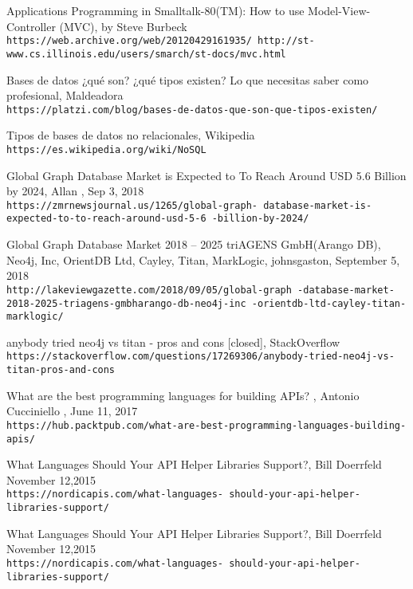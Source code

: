 \begin{thebibliography}{999}
Applications Programming in Smalltalk-80(TM):
How to use Model-View-Controller (MVC), by Steve Burbeck
\\\texttt{https://web.archive.org/web/20120429161935/
http://st-www.cs.illinois.edu/users/smarch/st-docs/mvc.html}


Bases de datos ¿qué son? ¿qué tipos existen? Lo que necesitas saber como profesional, Maldeadora
\\\texttt{https://platzi.com/blog/bases-de-datos-que-son-que-tipos-existen/}

Tipos de bases de datos no relacionales, Wikipedia
\\\texttt{https://es.wikipedia.org/wiki/NoSQL}

Global Graph Database Market is Expected to To Reach Around USD 5.6 Billion by 2024, Allan , Sep 3, 2018
\\\texttt{https://zmrnewsjournal.us/1265/global-graph-
database-market-is-expected-to-to-reach-around-usd-5-6
-billion-by-2024/}


Global Graph Database Market 2018 – 2025 triAGENS GmbH(Arango DB), Neo4j, Inc, OrientDB Ltd, Cayley, Titan, MarkLogic, johnsgaston, September 5, 2018 
\\\texttt{http://lakeviewgazette.com/2018/09/05/global-graph
-database-market-2018-2025-triagens-gmbharango-db-neo4j-inc
-orientdb-ltd-cayley-titan-marklogic/}

anybody tried neo4j vs titan - pros and cons [closed], StackOverflow
\\\texttt{https://stackoverflow.com/questions/17269306/anybody-tried-neo4j-vs-titan-pros-and-cons}

What are the best programming languages for building APIs? , Antonio Cucciniello , June 11, 2017
\\\texttt{https://hub.packtpub.com/what-are-best-programming-languages-building-apis/}

What Languages Should Your API Helper Libraries Support?,  Bill Doerrfeld November 12,2015
\\\texttt{https://nordicapis.com/what-languages-
should-your-api-helper-libraries-support/}

What Languages Should Your API Helper Libraries Support?,  Bill Doerrfeld November 12,2015
\\\texttt{https://nordicapis.com/what-languages-
should-your-api-helper-libraries-support/}


\end{thebibliography}
